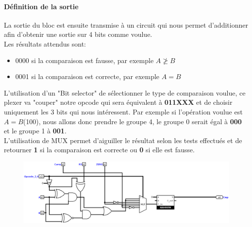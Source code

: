 \documentclass[a4paper]{article}
\begin{document}
\begin{tcolorbox}[colframe=Monokaimagenta,colback=white]
\paragraph{Définition de la sortie}
La sortie du bloc est ensuite transmise à un circuit qui nous permet d'additionner afin d'obtenir une sortie sur 4 bits comme voulue.\\
Les résultats attendus sont: 
\begin{itemize}
 \item    0000 si la comparaison est fausse, par exemple $A \ngeq B$
 \item    0001 si la comparaison est correcte, par exemple $A = B$
\end{itemize}
L'utilisation d'un "Bit selector" de sélectionner le type de comparaison voulue, ce plexer va "couper" notre opcode qui sera équivalent à \textbf{011XXX} et de choisir uniquement les 3 bits qui nous intéressent. Par exemple si l'opération voulue est $A=B$(100), nous allons donc prendre le groupe 4, le groupe 0 serait égal à \textbf{000} et le groupe 1 à \textbf{001}.\\
L'utilisation de MUX permet d'aiguiller le résultat selon les tests effectués et de retourner \textbf{1} si la comparaison est correcte ou \textbf{0} si elle est fausse.
\begin{figure}[H]
    \centering
    \includegraphics[width=\textwidth]{src/COMPATEUR.png}
    \label{fig:OVERFADDSUB_4BITS}
\end{figure}
\end{tcolorbox}
\end{document}
